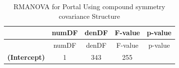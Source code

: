 \documentclass[]{article}
\begin{document}
\begin{longtable}[c]{@{}ccccc@{}}
\caption{RMANOVA for Portal Using compound symmetry covariance
Structure}\tabularnewline
\toprule
\begin{minipage}[b]{0.25\columnwidth}\centering\strut
~
\strut\end{minipage} &
\begin{minipage}[b]{0.10\columnwidth}\centering\strut
numDF
\strut\end{minipage} &
\begin{minipage}[b]{0.10\columnwidth}\centering\strut
denDF
\strut\end{minipage} &
\begin{minipage}[b]{0.12\columnwidth}\centering\strut
F-value
\strut\end{minipage} &
\begin{minipage}[b]{0.12\columnwidth}\centering\strut
p-value
\strut\end{minipage}\tabularnewline
\midrule
\endfirsthead
\toprule
\begin{minipage}[b]{0.25\columnwidth}\centering\strut
~
\strut\end{minipage} &
\begin{minipage}[b]{0.10\columnwidth}\centering\strut
numDF
\strut\end{minipage} &
\begin{minipage}[b]{0.10\columnwidth}\centering\strut
denDF
\strut\end{minipage} &
\begin{minipage}[b]{0.12\columnwidth}\centering\strut
F-value
\strut\end{minipage} &
\begin{minipage}[b]{0.12\columnwidth}\centering\strut
p-value
\strut\end{minipage}\tabularnewline
\midrule
\endhead
\begin{minipage}[t]{0.25\columnwidth}\centering\strut
\textbf{(Intercept)}
\strut\end{minipage} &
\begin{minipage}[t]{0.10\columnwidth}\centering\strut
1
\strut\end{minipage} &
\begin{minipage}[t]{0.10\columnwidth}\centering\strut
343
\strut\end{minipage} &
\begin{minipage}[t]{0.12\columnwidth}\centering\strut
255
\strut\end{minipage} &
\begin{minipage}[t]{0.12\columnwidth}\centering\strut

\end{minipage}
\end{longtable}
\end{document}
